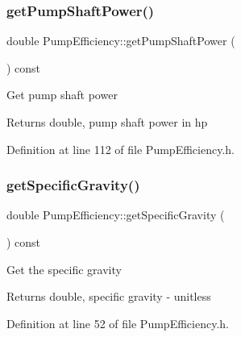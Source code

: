 \subsubsection{\texorpdfstring{get\+Pump\+Shaft\+Power()}{getPumpShaftPower()}\hspace{0.1cm}{\footnotesize\ttfamily [3/3]}}
{\footnotesize\ttfamily double Pump\+Efficiency\+::get\+Pump\+Shaft\+Power (\begin{DoxyParamCaption}{ }\end{DoxyParamCaption}) const\hspace{0.3cm}{\ttfamily [inline]}}

Get pump shaft power

\begin{DoxyReturn}{Returns}
double, pump shaft power in hp 
\end{DoxyReturn}


Definition at line 112 of file Pump\+Efficiency.\+h.

\mbox{\label{class_pump_efficiency_a6eeeabb70d99a79a636f35ca74d8ec05}} 
\subsubsection{\texorpdfstring{get\+Specific\+Gravity()}{getSpecificGravity()}\hspace{0.1cm}{\footnotesize\ttfamily [1/3]}}
{\footnotesize\ttfamily double Pump\+Efficiency\+::get\+Specific\+Gravity (\begin{DoxyParamCaption}{ }\end{DoxyParamCaption}) const\hspace{0.3cm}{\ttfamily [inline]}}

Get the specific gravity

\begin{DoxyReturn}{Returns}
double, specific gravity -\/ unitless 
\end{DoxyReturn}


Definition at line 52 of file Pump\+Efficiency.\+h.

\mbox{\label{class_pump_efficiency_a6eeeabb70d99a79a636f35ca74d8ec05}} 
